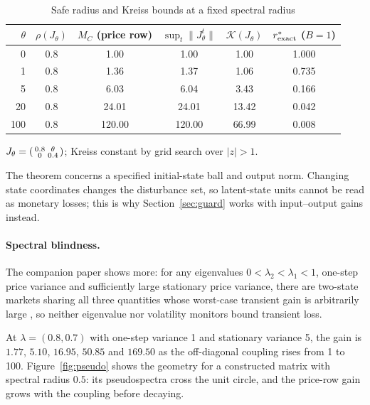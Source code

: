\documentclass[12pt]{article}
\theoremstyle{definition}
\theoremstyle{remark}
\begin{document}
\begin{table}[t]\centering\small
\begin{threeparttable}
\caption{Safe radius and Kreiss bounds at a fixed spectral radius}\label{tab:kreiss}
\begin{tabular}{rccccc}
\toprule
$\theta$ & $\rho(J_\theta)$ & $M_C$ (price row) & $\sup_t\|J_\theta^t\|$ & $\mathcal K(J_\theta)$ & $r^*_{\rm exact}$ ($B=1$)\\
\midrule
0 & 0.8 & 1.00 & 1.00 & 1.00 & 1.000\\
1 & 0.8 & 1.36 & 1.37 & 1.06 & 0.735\\
5 & 0.8 & 6.03 & 6.04 & 3.43 & 0.166\\
20 & 0.8 & 24.01 & 24.01 & 13.42 & 0.042\\
100 & 0.8 & 120.00 & 120.00 & 66.99 & 0.008\\
\bottomrule
\end{tabular}
\begin{tablenotes}\footnotesize\item $J_\theta=\begin{psmallmatrix}0.8&\theta\\0&0.4\end{psmallmatrix}$; Kreiss constant by grid search over $|z|>1$. \end{tablenotes}
\end{threeparttable}
\end{table}

The theorem concerns a specified initial-state ball and output norm. Changing state coordinates changes the disturbance set, so latent-state units cannot be read as monetary losses; this is why Section~\ref{sec:guard} works with input--output gains instead.

\paragraph{Spectral blindness.} The companion paper shows more: for any eigenvalues $0<\lambda_2<\lambda_1<1$, one-step price variance and sufficiently large stationary price variance, there are two-state markets sharing all three quantities whose worst-case transient gain is arbitrarily large \citep[spectral-blindness theorem]{niroula2026}, so neither eigenvalue nor volatility monitors bound transient loss.

At $\lambda=(0.8,0.7)$ with one-step variance 1 and stationary variance 5, the gain is $1.77$, $5.10$, $16.95$, $50.85$ and $169.50$ as the off-diagonal coupling rises from 1 to 100. Figure~\ref{fig:pseudo} shows the geometry for a constructed matrix with spectral radius $0.5$: its pseudospectra cross the unit circle, and the price-row gain grows with the coupling before decaying.
\end{document}
